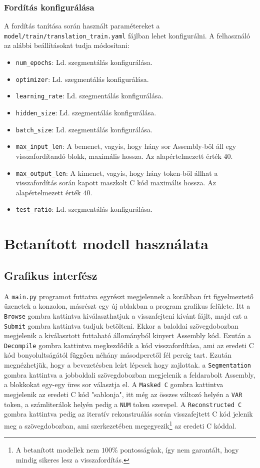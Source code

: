 \subsubsection{Fordítás konfigurálása}

A fordítás tanítása során használt paramétereket
a \texttt{model/train/translation\_train.yaml} fájlban lehet konfigurálni.
A felhasználó az alábbi beállításokat tudja módosítani:
\begin{itemize}
    \item \texttt{num\_epochs}: Ld. szegmentálás konfigurálása.
    \item \texttt{optimizer}: Ld. szegmentálás konfigurálása.
    \item \texttt{learning\_rate}: Ld. szegmentálás konfigurálása.
    \item \texttt{hidden\_size}: Ld. szegmentálás konfigurálása.
    \item \texttt{batch\_size}: Ld. szegmentálás konfigurálása.
    \item \texttt{max\_input\_len}: A bemenet, vagyis, hogy hány sor
        Assembly-ből áll egy visszafordítandó blokk, maximális hossza. Az
        alapértelmezett érték $40$.
    \item \texttt{max\_output\_len}: A kimenet, vagyis, hogy hány token-ből
        állhat a visszafordítás során kapott maszkolt C kód maximális hossza.
        Az alapértelmezett érték $40$.
    \item \texttt{test\_ratio}: Ld. szegmentálás konfigurálása.
\end{itemize}

\section{Betanított modell használata}
\subsection{Grafikus interfész}
A \texttt{main.py} programot futtatva egyrészt megjelennek a korábban írt
figyelmeztető üzenetek a konzolon, másrészt egy új ablakban a program grafikus
felülete. Itt a \texttt{Browse} gombra kattintva kiválaszthatjuk
a visszafejteni kívánt fájlt, majd ezt a \texttt{Submit} gombra kattintva
tudjuk betölteni. Ekkor a baloldai szövegdobozban megjelenik a kiválasztott futtaható
állományból kinyert Assembly kód. Ezután a \texttt{Decompile} gombra kattintva
megkezdődik a kód visszafordítása, ami az eredeti C kód bonyolultságától
függően néhány másodperctől fél percig tart. Ezután megnézhetjük, hogy
a bevezetésben leírt lépesek hogy zajlottak. a \texttt{Segmentation} gombra
kattintva a jobboldali szövegdobozban megjelenik a feldarabolt Assembly,
a blokkokat egy-egy üres sor választja el. A \texttt{Masked C} gombra kattintva
megjelenik az eredeti C kód "sablonja", itt még az összes változó helyén
a \texttt{VAR} token, a számliterálok helyén pedig a \texttt{NUM} token
szerepel. A \texttt{Reconstructed C} gombra kattintva pedig az iteratív
rekonstruálás során visszafejtett C kód jelenik meg a szövegdobozban, ami
szerkezetében megegyezik\footnote{A betanított modellek nem $100\%$
pontosságúak, így nem garantált, hogy mindig sikeres lesz a visszafordítás.} az
eredeti C kóddal.

